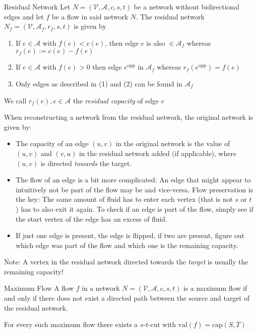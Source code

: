\begin{definition}[]{Residual Network}
    Let $N = (\mathcal{V}, \mathcal{A}, c, s, t)$ be a network without bidirectional edges and let $f$ be a flow in said network $N$. The residual network $N_f = (\mathcal{V}, \mathcal{A}_f, r_f, s, t)$ is given by
    \begin{enumerate}[label=(\arabic*)]
        \item If $e \in \mathcal{A}$ with $f(e) < c(e)$, then edge $e$ is also $\in \mathcal{A}_f$ whereas $r_f(e) := c(e) - f(e)$
        \item If $e \in \mathcal{A}$ with $f(e) > 0$ then edge $e^{\text{opp}}$ in $\mathcal{A}_f$ whereas $r_f(e^{\text{opp}}) = f(e)$
        \item Only edges as described in (1) and (2) can be found in $\mathcal{A}_f$
    \end{enumerate}

    We call $r_f(e), e \in \mathcal{A}$ the \textit{residual capacity} of edge $e$
\end{definition}

When reconstructing a network from the residual network, the original network is given by:
\begin{itemize}
    \item The capacity of an edge $(u, v)$ in the original network is the value of $(u, v)$ and $(v, u)$ in the residual network added (if applicable), where $(u, v)$ is directed \textit{towards} the target.
    \item The flow of an edge is a bit more complicated: An edge that might appear to intuitively not be part of the flow may be and vice-versa.
          Flow preservation is the key: The same amount of fluid has to enter each vertex (that is not $s$ or $t$) has to also exit it again.
          To check if an edge is part of the flow, simply see if the start vertex of the edge has an excess of fluid.
    \item If just one edge is present, the edge is flipped, if two are present, figure out which edge was part of the flow and which one is the remaining capacity.
\end{itemize}
Note: A vertex in the residual network directed towards the \textit{target} is usually the remaining capacity!

\begin{theorem}[]{Maximum Flow}
    A flow $f$ in a network $N = (\mathcal{V}, \mathcal{A}, c, s, t)$ is a maximum flow if and only if there does not exist a directed path between the source and target of the residual network.

    For every such maximum flow there exists a $s$-$t$-cut with $\text{val}(f) = \text{cap}(S, T)$
\end{theorem}
